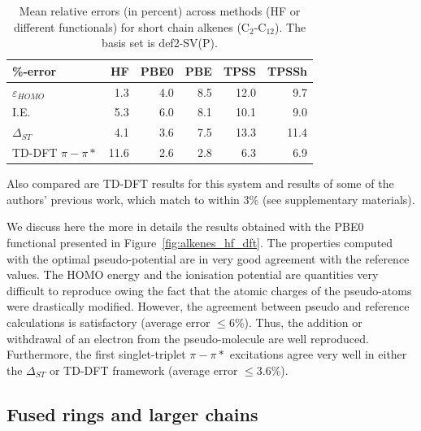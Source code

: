 \documentclass[aip]{revtex4-1}
\begin{document}
\begin{table}[ht]
\caption{Mean relative errors (in percent) across methods (HF or different functionals)
for short chain alkenes  (C\(_{2}\)-C\(_{12}\)).
The basis set is def2-SV(P).}
\begin{tabular}{l r r r r r }
\hline \hline
\%-error                & HF & PBE0 & PBE & TPSS & TPSSh \\
\hline
$\varepsilon_{HOMO}$    & 1.3 & 4.0 & 8.5 & 12.0 &  9.7 \\
I.E.                    & 5.3 & 6.0 & 8.1 & 10.1 &  9.0 \\
$\Delta_{ST}$           & 4.1 & 3.6 & 7.5 & 13.3 & 11.4 \\
TD-DFT $\pi-\pi*$       & 11.6 & 2.6 & 2.8 &  6.3 &  6.9 \\ 
\hline\hline
\end{tabular}
\label{table:alkene_errors}
\end{table}

Also compared are TD-DFT results for this system and results of some of the authors' previous work,
which match to within 3\% (see supplementary materials).\cite{drujon_pseudopotentials_2013}

We discuss here the more in details the results obtained with the PBE0 functional presented
in Figure~\ref{fig:alkenes_hf_dft}.
The properties computed with the optimal pseudo-potential are in very good
agreement with the reference values.
The HOMO energy and the ionisation potential are quantities very difficult to reproduce
owing the fact that the atomic charges of the pseudo-atoms were drastically modified.
However, the agreement between pseudo and reference calculations is satisfactory
(average error $\le 6\%$).
Thus, the addition or withdrawal of an electron from the pseudo-molecule are well reproduced.
Furthermore, the first singlet-triplet $\pi-\pi*$ excitations agree very well in either
the $\Delta_{ST}$ or TD-DFT framework (average error $\le 3.6\%$).

\subsection{Fused rings and larger chains}
\end{document}
